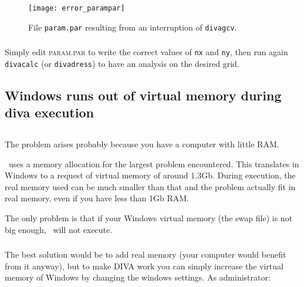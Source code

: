 \begin{figure}[htpb]
\centering
\texttt{[image: error\_parampar]}
\caption{File \texttt{param.par} resulting from an interruption of \texttt{divagcv}.\label{fig:errorparampar}}
\end{figure}

\subsubsection{\answer}


Simply edit \textsc{param.par} to write the correct values of \texttt{nx} and \texttt{ny}, then run again \texttt{divacalc} (or \texttt{divadress}) to have an analysis on the desired grid.






\subsection{Windows runs out of virtual memory during diva execution}




\subsection{\question}

The problem arises probably because you have a computer with little RAM.

\diva\, uses a memory allocation for the largest problem encountered. This 
translates in Windows to a request of virtual memory of around 1.3Gb.
During execution, the real memory used can be much smaller than that and 
the problem actually fit in real memory, even if you have less than 1Gb RAM.

The only problem is that if your Windows virtual memory (the swap file) 
is not big enough, \diva\, will not execute.


\subsubsection{\answer}

The best solution would be to 
add real memory (your computer would benefit from it anyway), but to 
make DIVA work you can simply increase the virtual memory of Windows by 
changing the windows settings. As administrator:\\

